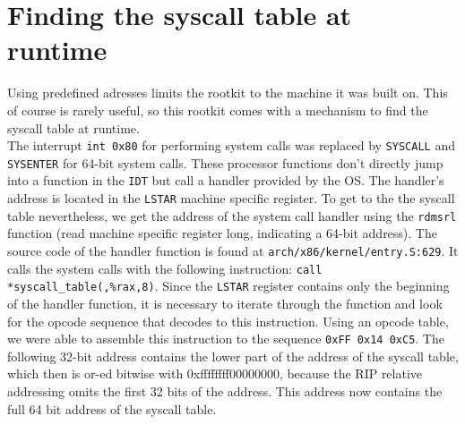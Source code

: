 \section{Finding the syscall table at runtime}
Using predefined adresses limits the rootkit to the machine it was 
built on. This of course is rarely useful, so this rootkit comes with a 
mechanism to find the syscall table at runtime. \\
The interrupt \texttt{int 0x80} for performing system calls was replaced by 
\texttt{SYSCALL} and \texttt{SYSENTER} for 64-bit system calls. These processor 
functions don't directly jump into a function in the \texttt{IDT} but call a 
handler provided by the OS. The handler's address is located in the 
\texttt{LSTAR} machine specific register. To get to the the syscall table 
nevertheless, we get the address of the system call handler using the 
\texttt{rdmsrl} function (read 
machine specific register long, indicating a 64-bit address). The source code 
of the handler function is found at \texttt{arch/x86/kernel/entry.S:629}. It 
calls the system calls with the following instruction: 
\verb+call *syscall_table(,%rax,8)+. Since the \texttt{LSTAR} 
register contains only the beginning of the handler function, it is necessary 
to iterate through the function and look for the opcode sequence that decodes 
to this instruction. Using an opcode table, we were able to 
assemble this instruction to the sequence \texttt{0xFF 0x14 0xC5}. The following 
32-bit address contains the lower part of the address of the syscall table,
which then is or-ed bitwise with 0xffffffff00000000, because the RIP 
relative addressing omits the first 32 bits of the address. This address now 
contains the full 64 bit address of the syscall table. 
